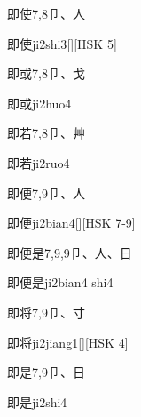 \begin{Entry}{即使}{7,8}{⼙、⼈}
  \begin{Phonetics}{即使}{ji2shi3}[][HSK 5]
  \end{Phonetics}
\end{Entry}

\begin{Entry}{即或}{7,8}{⼙、⼽}
  \begin{Phonetics}{即或}{ji2huo4}
  \end{Phonetics}
\end{Entry}

\begin{Entry}{即若}{7,8}{⼙、⾋}
  \begin{Phonetics}{即若}{ji2ruo4}
  \end{Phonetics}
\end{Entry}

\begin{Entry}{即便}{7,9}{⼙、⼈}
  \begin{Phonetics}{即便}{ji2bian4}[][HSK 7-9]
  \end{Phonetics}
\end{Entry}

\begin{Entry}{即便是}{7,9,9}{⼙、⼈、⽇}
  \begin{Phonetics}{即便是}{ji2bian4 shi4}
  \end{Phonetics}
\end{Entry}

\begin{Entry}{即将}{7,9}{⼙、⼨}
  \begin{Phonetics}{即将}{ji2jiang1}[][HSK 4]
  \end{Phonetics}
\end{Entry}

\begin{Entry}{即是}{7,9}{⼙、⽇}
  \begin{Phonetics}{即是}{ji2shi4}
  \end{Phonetics}
\end{Entry}

